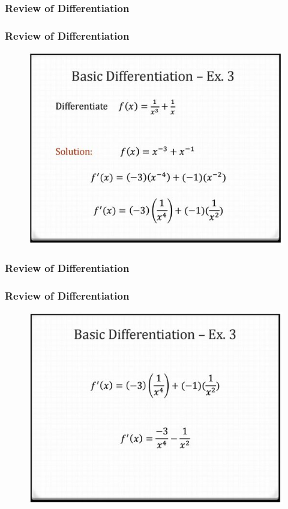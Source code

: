 \documentclass{beamer}
\begin{document}
\begin{frame}
	
	\frametitle{Review of Differentiation}
	
\end{frame}
\begin{frame}
	
	\frametitle{Review of Differentiation}
	\begin{figure}
		\centering
		\includegraphics[width=0.95\linewidth]{diff1c}
		
	\end{figure}
\end{frame}
\begin{frame}
	
	\frametitle{Review of Differentiation}
	
\end{frame}
\begin{frame}
	
	\frametitle{Review of Differentiation}
	\begin{figure}
		\centering
		\includegraphics[width=0.95\linewidth]{diff1d}
		
	\end{figure}
\end{frame}
\end{document}

